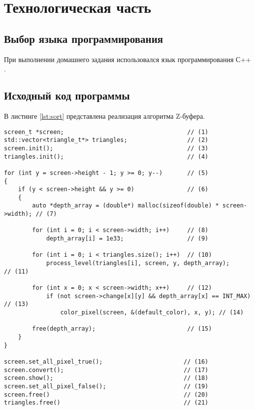 \chapter{Технологическая часть}

\section{Выбор языка программирования}

При выполнении домашнего задания использовался язык программирования С++ \cite{Cpp}.

\section{Исходный код программы}

В листинге \ref{lst:sort} представлена реализация алгоритма Z-буфера.


\begin{lstlisting}[label=lst:sort,caption=Алгоритм Z-буфера]
screen_t *screen;                                   // (1)
std::vector<triangle_t*> triangles;                 // (2) 
screen.init();                                      // (3)
triangles.init();                                   // (4) 

for (int y = screen->height - 1; y >= 0; y--)       // (5)
{     
    if (y < screen->height && y >= 0)               // (6)
    {             
        auto *depth_array = (double*) malloc(sizeof(double) * screen->width); // (7)

        for (int i = 0; i < screen->width; i++)     // (8)                          
            depth_array[i] = 1e33;                  // (9)

        for (int i = 0; i < triangles.size(); i++)  // (10)
            process_level(triangles[i], screen, y, depth_array);         // (11)   

        for (int x = 0; x < screen->width; x++)     // (12)
            if (not screen->change[x][y] && depth_array[x] == INT_MAX)   // (13) 
                color_pixel(screen, &(default_color), x, y); // (14)

        free(depth_array);                          // (15)
    }
}

screen.set_all_pixel_true();                       // (16)  
screen.convert();                                  // (17)
screen.show();                                     // (18)  
screen.set_all_pixel_false();                      // (19)  
screen.free()                                      // (20)  
triangles.free()                                   // (21) 
\end{lstlisting}

